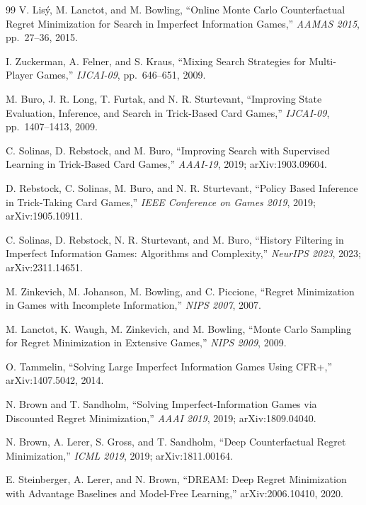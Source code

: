 \begin{thebibliography}{99}
V. Lis\'y, M. Lanctot, and M. Bowling, ``Online Monte Carlo Counterfactual
Regret Minimization for Search in Imperfect Information Games,''
\emph{AAMAS 2015}, pp.~27--36, 2015.

I. Zuckerman, A. Felner, and S. Kraus, ``Mixing Search Strategies for
Multi-Player Games,'' \emph{IJCAI-09}, pp.~646--651, 2009.

M. Buro, J. R. Long, T. Furtak, and N. R. Sturtevant, ``Improving State
Evaluation, Inference, and Search in Trick-Based Card Games,'' \emph{IJCAI-09},
pp.~1407--1413, 2009.

C. Solinas, D. Rebstock, and M. Buro, ``Improving Search with Supervised
Learning in Trick-Based Card Games,'' \emph{AAAI-19}, 2019; arXiv:1903.09604.

D. Rebstock, C. Solinas, M. Buro, and N. R. Sturtevant, ``Policy Based Inference
in Trick-Taking Card Games,'' \emph{IEEE Conference on Games 2019}, 2019;
arXiv:1905.10911.

C. Solinas, D. Rebstock, N. R. Sturtevant, and M. Buro, ``History Filtering in
Imperfect Information Games: Algorithms and Complexity,'' \emph{NeurIPS 2023},
2023; arXiv:2311.14651.


M. Zinkevich, M. Johanson, M. Bowling, and C. Piccione, ``Regret Minimization in
Games with Incomplete Information,'' \emph{NIPS 2007}, 2007.

M. Lanctot, K. Waugh, M. Zinkevich, and M. Bowling, ``Monte Carlo Sampling for
Regret Minimization in Extensive Games,'' \emph{NIPS 2009}, 2009.

O. Tammelin, ``Solving Large Imperfect Information Games Using CFR+,''
arXiv:1407.5042, 2014.

N. Brown and T. Sandholm, ``Solving Imperfect-Information Games via Discounted
Regret Minimization,'' \emph{AAAI 2019}, 2019; arXiv:1809.04040.

N. Brown, A. Lerer, S. Gross, and T. Sandholm, ``Deep Counterfactual Regret
Minimization,'' \emph{ICML 2019}, 2019; arXiv:1811.00164.

E. Steinberger, A. Lerer, and N. Brown, ``DREAM: Deep Regret Minimization with
Advantage Baselines and Model-Free Learning,'' arXiv:2006.10410, 2020.


\end{thebibliography}

